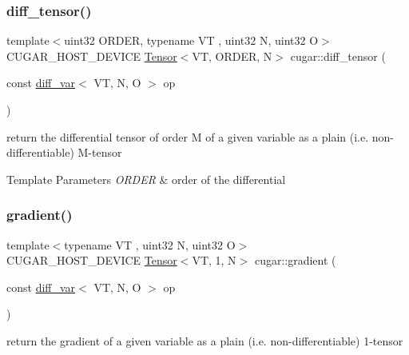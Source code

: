 \subsubsection{\texorpdfstring{diff\+\_\+tensor()}{diff\_tensor()}}
{\footnotesize\ttfamily template$<$uint32 O\+R\+D\+ER, typename VT , uint32 N, uint32 O$>$ \\
C\+U\+G\+A\+R\+\_\+\+H\+O\+S\+T\+\_\+\+D\+E\+V\+I\+CE \hyperlink{structcugar_1_1_tensor}{Tensor}$<$VT, O\+R\+D\+ER, N$>$ cugar\+::diff\+\_\+tensor (\begin{DoxyParamCaption}\item[{const \hyperlink{structcugar_1_1diff__var}{diff\+\_\+var}$<$ VT, N, O $>$}]{op }\end{DoxyParamCaption})\hspace{0.3cm}{\ttfamily [inline]}}

return the differential tensor of order M of a given variable as a plain (i.\+e. non-\/differentiable) M-\/tensor


\begin{DoxyTemplParams}{Template Parameters}
{\em O\+R\+D\+ER} & order of the differential \\
\hline
\end{DoxyTemplParams}
\mbox{\label{group___auto_diff_module_ga1e2e54616fb22c1790370f97fe73c4f2}} 
\subsubsection{\texorpdfstring{gradient()}{gradient()}}
{\footnotesize\ttfamily template$<$typename VT , uint32 N, uint32 O$>$ \\
C\+U\+G\+A\+R\+\_\+\+H\+O\+S\+T\+\_\+\+D\+E\+V\+I\+CE \hyperlink{structcugar_1_1_tensor}{Tensor}$<$VT, 1, N$>$ cugar\+::gradient (\begin{DoxyParamCaption}\item[{const \hyperlink{structcugar_1_1diff__var}{diff\+\_\+var}$<$ VT, N, O $>$}]{op }\end{DoxyParamCaption})\hspace{0.3cm}{\ttfamily [inline]}}

return the gradient of a given variable as a plain (i.\+e. non-\/differentiable) 1-\/tensor \mbox{\label{group___auto_diff_module_ga4805d8e3da7f18fc7305c77432e6519b}} 
